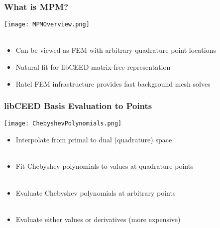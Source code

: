 \documentclass{beamer}
\begin{document}
\begin{frame}
\begin{center}
\frametitle{What is MPM?}

\texttt{[image: MPMOverview.png]}\\

~\\

\begin{itemize}

\item Can be viewed as FEM with arbitrary quadrature point locations\\

\item Natural fit for libCEED matrix-free representation\\

\item Ratel FEM infrastructure provides fast background mesh solves\\

\end{itemize}

\end{center}
\end{frame}


\begin{frame}
\begin{center}
\frametitle{libCEED Basis Evaluation to Points}

\begin{center}
\texttt{[image: ChebyshevPolynomials.png]}
\end{center}

\begin{itemize}

\item Interpolate from primal to dual (quadrature) space\\

~\\

\item Fit Chebyshev polynomials to values at quadrature points\\

~\\

\item Evaluate Chebyshev polynomials at arbitrary points\\

~\\

\item Evaluate either values or derivatives (more expensive)\\

\end{itemize}

\end{center}
\end{frame}
\end{document}
